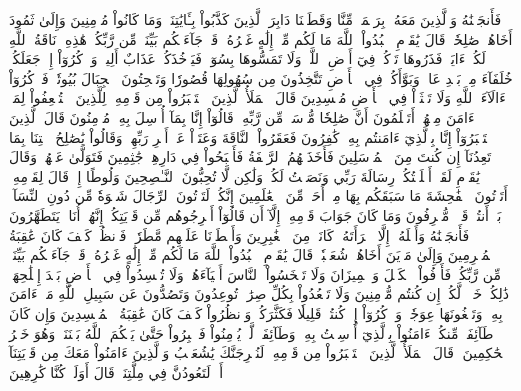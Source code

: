فَأَنجَيۡنَٰهُ وَٱلَّذِينَ مَعَهُۥ بِرَحۡمَةٖ مِّنَّا وَقَطَعۡنَا دَابِرَ ٱلَّذِينَ كَذَّبُواْ بِـَٔايَٰتِنَاۖ وَمَا كَانُواْ مُؤۡمِنِينَ
وَإِلَىٰ ثَمُودَ أَخَاهُمۡ صَٰلِحٗاۚ قَالَ يَٰقَوۡمِ ٱعۡبُدُواْ ٱللَّهَ مَا لَكُم مِّنۡ إِلَٰهٍ غَيۡرُهُۥۖ قَدۡ جَآءَتۡكُم بَيِّنَةٞ مِّن رَّبِّكُمۡۖ هَٰذِهِۦ نَاقَةُ ٱللَّهِ لَكُمۡ ءَايَةٗۖ فَذَرُوهَا تَأۡكُلۡ فِيٓ أَرۡضِ ٱللَّهِۖ وَلَا تَمَسُّوهَا بِسُوٓءٖ فَيَأۡخُذَكُمۡ عَذَابٌ أَلِيمٞ
وَٱذۡكُرُوٓاْ إِذۡ جَعَلَكُمۡ خُلَفَآءَ مِنۢ بَعۡدِ عَادٖ وَبَوَّأَكُمۡ فِي ٱلۡأَرۡضِ تَتَّخِذُونَ مِن سُهُولِهَا قُصُورٗا وَتَنۡحِتُونَ ٱلۡجِبَالَ بُيُوتٗاۖ فَٱذۡكُرُوٓاْ ءَالَآءَ ٱللَّهِ وَلَا تَعۡثَوۡاْ فِي ٱلۡأَرۡضِ مُفۡسِدِينَ
قَالَ ٱلۡمَلَأُ ٱلَّذِينَ ٱسۡتَكۡبَرُواْ مِن قَوۡمِهِۦ لِلَّذِينَ ٱسۡتُضۡعِفُواْ لِمَنۡ ءَامَنَ مِنۡهُمۡ أَتَعۡلَمُونَ أَنَّ صَٰلِحٗا مُّرۡسَلٞ مِّن رَّبِّهِۦۚ قَالُوٓاْ إِنَّا بِمَآ أُرۡسِلَ بِهِۦ مُؤۡمِنُونَ
قَالَ ٱلَّذِينَ ٱسۡتَكۡبَرُوٓاْ إِنَّا بِٱلَّذِيٓ ءَامَنتُم بِهِۦ كَٰفِرُونَ
فَعَقَرُواْ ٱلنَّاقَةَ وَعَتَوۡاْ عَنۡ أَمۡرِ رَبِّهِمۡ وَقَالُواْ يَٰصَٰلِحُ ٱئۡتِنَا بِمَا تَعِدُنَآ إِن كُنتَ مِنَ ٱلۡمُرۡسَلِينَ
فَأَخَذَتۡهُمُ ٱلرَّجۡفَةُ فَأَصۡبَحُواْ فِي دَارِهِمۡ جَٰثِمِينَ
فَتَوَلَّىٰ عَنۡهُمۡ وَقَالَ يَٰقَوۡمِ لَقَدۡ أَبۡلَغۡتُكُمۡ رِسَالَةَ رَبِّي وَنَصَحۡتُ لَكُمۡ وَلَٰكِن لَّا تُحِبُّونَ ٱلنَّـٰصِحِينَ
وَلُوطًا إِذۡ قَالَ لِقَوۡمِهِۦٓ أَتَأۡتُونَ ٱلۡفَٰحِشَةَ مَا سَبَقَكُم بِهَا مِنۡ أَحَدٖ مِّنَ ٱلۡعَٰلَمِينَ
إِنَّكُمۡ لَتَأۡتُونَ ٱلرِّجَالَ شَهۡوَةٗ مِّن دُونِ ٱلنِّسَآءِۚ بَلۡ أَنتُمۡ قَوۡمٞ مُّسۡرِفُونَ
وَمَا كَانَ جَوَابَ قَوۡمِهِۦٓ إِلَّآ أَن قَالُوٓاْ أَخۡرِجُوهُم مِّن قَرۡيَتِكُمۡۖ إِنَّهُمۡ أُنَاسٞ يَتَطَهَّرُونَ
فَأَنجَيۡنَٰهُ وَأَهۡلَهُۥٓ إِلَّا ٱمۡرَأَتَهُۥ كَانَتۡ مِنَ ٱلۡغَٰبِرِينَ
وَأَمۡطَرۡنَا عَلَيۡهِم مَّطَرٗاۖ فَٱنظُرۡ كَيۡفَ كَانَ عَٰقِبَةُ ٱلۡمُجۡرِمِينَ
وَإِلَىٰ مَدۡيَنَ أَخَاهُمۡ شُعَيۡبٗاۚ قَالَ يَٰقَوۡمِ ٱعۡبُدُواْ ٱللَّهَ مَا لَكُم مِّنۡ إِلَٰهٍ غَيۡرُهُۥۖ قَدۡ جَآءَتۡكُم بَيِّنَةٞ مِّن رَّبِّكُمۡۖ فَأَوۡفُواْ ٱلۡكَيۡلَ وَٱلۡمِيزَانَ وَلَا تَبۡخَسُواْ ٱلنَّاسَ أَشۡيَآءَهُمۡ وَلَا تُفۡسِدُواْ فِي ٱلۡأَرۡضِ بَعۡدَ إِصۡلَٰحِهَاۚ ذَٰلِكُمۡ خَيۡرٞ لَّكُمۡ إِن كُنتُم مُّؤۡمِنِينَ
وَلَا تَقۡعُدُواْ بِكُلِّ صِرَٰطٖ تُوعِدُونَ وَتَصُدُّونَ عَن سَبِيلِ ٱللَّهِ مَنۡ ءَامَنَ بِهِۦ وَتَبۡغُونَهَا عِوَجٗاۚ وَٱذۡكُرُوٓاْ إِذۡ كُنتُمۡ قَلِيلٗا فَكَثَّرَكُمۡۖ وَٱنظُرُواْ كَيۡفَ كَانَ عَٰقِبَةُ ٱلۡمُفۡسِدِينَ
وَإِن كَانَ طَآئِفَةٞ مِّنكُمۡ ءَامَنُواْ بِٱلَّذِيٓ أُرۡسِلۡتُ بِهِۦ وَطَآئِفَةٞ لَّمۡ يُؤۡمِنُواْ فَٱصۡبِرُواْ حَتَّىٰ يَحۡكُمَ ٱللَّهُ بَيۡنَنَاۚ وَهُوَ خَيۡرُ ٱلۡحَٰكِمِينَ
۞قَالَ ٱلۡمَلَأُ ٱلَّذِينَ ٱسۡتَكۡبَرُواْ مِن قَوۡمِهِۦ لَنُخۡرِجَنَّكَ يَٰشُعَيۡبُ وَٱلَّذِينَ ءَامَنُواْ مَعَكَ مِن قَرۡيَتِنَآ أَوۡ لَتَعُودُنَّ فِي مِلَّتِنَاۚ قَالَ أَوَلَوۡ كُنَّا كَٰرِهِينَ
